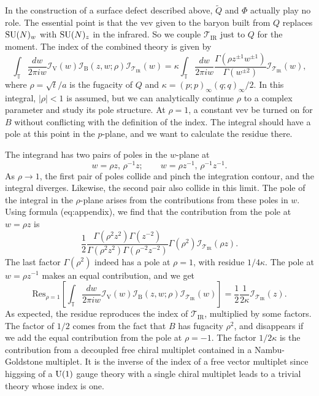 In the construction of a surface defect described above, $\tilde{Q}$
and $\Phi$ actually play no role. The essential point is that the
vev given to the baryon built from $Q$ replaces $\mathrm{SU}(N)_{w}$ with
$\mathrm{SU}(N)_{z}$ in the infrared. So we couple $\mathcal{T}_{\mathrm{IR}}$
just to $Q$ for the moment. The index of the combined theory is given
by
\begin{equation}
    \int_{\mathbb{T}}\frac{dw}{2\pi iw}
    \mathcal{I}_{\mathrm{V}}(w)
    \mathcal{I}_{\mathrm{B}}(z,w;\rho)
    \mathcal{I}_{\mathcal{T}_{\mathrm{IR}}}(w)  
      =  
        \kappa  \int_{\mathbb{T}}\frac{dw}{2\pi iw}
        \frac{\Gamma(\rho z^{\pm1}w^{\pm1})}{\Gamma(w^{\pm2})}
        \mathcal{I}_{\mathcal{T}_{\mathrm{IR}}}(w),
\end{equation}
where $\rho=\sqrt{t}/a$ is the fugacity of $Q$ and $\kappa=(p;p)_{\infty}(q;q)_{\infty}/2$.
In this integral, $|\rho|<1$ is assumed, but we can analytically
continue $\rho$ to a complex parameter and study its pole structure.
At $\rho=1$, a constant vev be turned on for $B$ without conflicting
with the definition of the index. The integral should have a pole
at this point in the $p$-plane, and we want to calculate the residue
there.

The integrand has two pairs of poles in the $w$-plane at
\begin{equation}
    w  =  \rho z,  \,  \rho^{-1}z;  
    \quad\quad  
    w  =  \rho z^{-1},  \,  \rho^{-1}z^{-1}.
\end{equation}
 As $\rho\rightarrow1$, the first pair of poles collide and pinch
the integration contour, and the integral diverges. Likewise, the
second pair also collide in this limit. The pole of the integral in
the $\rho$-plane arises from the contributions from these poles in
$w$. Using formula (eq:appendix), we find that the contribution from
the pole at $w=\rho z$ is 
\begin{equation}
    \frac{1}{2}\frac{\Gamma(\rho^{2}z^{2})\Gamma(z^{-2})}{\Gamma(\rho^{2}z^{2})\Gamma(\rho^{-2}z^{-2})}
    \Gamma(\rho^{2})
    \mathcal{I}_{\mathcal{T}_{\mathrm{IR}}}(\rho z).
\end{equation}
 The last factor $\Gamma(\rho^{2})$ indeed has a pole at $\rho=1$,
with residue $1/4\kappa$. The pole at $w=\rho z^{-1}$ makes an equal
contribution, and we get
\begin{equation}
    \mathrm{Res}_{\rho=1}
    \left[
      \int_{\mathbb{T}}\frac{dw}{2\pi iw}
      \mathcal{I}_{\mathrm{V}}(w)
      \mathcal{I}_{\mathrm{B}}(z,w;\rho)
      \mathcal{I}_{\mathcal{T}_{\mathrm{IR}}}(w)
    \right]  
      =  
        \frac{1}{2}  \frac{1}{2\kappa}
        \mathcal{I}_{\mathcal{T}_{\mathrm{IR}}}(z).
\end{equation}
As expected, the residue reproduces the index of $\mathcal{T}_{\mathrm{IR}}$,
multiplied by some factors. The factor of $1/2$ comes from the fact
that $B$ has fugacity $\rho^{2}$, and disappears if we add the equal
contribution from the pole at $\rho=-1$. The factor $1/2\kappa$
is the contribution from a decoupled free chiral multiplet contained
in a Nambu-Goldstone multiplet. It is the inverse of the index of
a free vector multiplet since higgsing of a $\mathrm{U}(1)$ gauge theory with
a single chiral multiplet leads to a trivial theory whose index is
one. 

